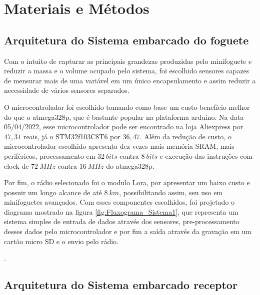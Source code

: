 \chapter{Materiais e Métodos} \label{ch:MM} %


\section{Arquitetura do Sistema embarcado do foguete} 

Com o intuito de capturar as principais grandezas produzidas pelo minifoguete e reduzir a massa e o volume ocupado pelo sistema, foi escolhido sensores capazes de mensurar mais de uma variável em um único encapsulamento e assim reduzir a necessidade de vários sensores separados. 

O microcontrolador foi escolhido tomando como base um custo-benefício melhor do que o atmega328p, que é bastante popular na plataforma arduino. Na data 05/04/2022, esse microcontrolador pode ser encontrado na loja Aliexpress por $47,31$ reais, já o STM32f103C8T6 por $36,47$. Além da redução de custo, o microcontrolador escolhido apresenta dez vezes mais memória SRAM, mais periféricos, processamento em $32 \ bits$ contra $8 \ bits$ e execução das instruções com clock de $72 \ MHz$ contra $16 \ MHz$ do atmega328p. 

Por fim, o rádio selecionado foi o modulo Lora, por apresentar um baixo custo e possuir um longo alcance de até $8 \ km$, possibilitando assim, seu uso em minifoguetes avançados. Com esses componentes escolhidos, foi projetado o diagrama mostrado na figura \ref{fig:Fluxograma_Sistema1}, que representa um sistema simples de entrada de dados através dos sensores, pre-processamento desses dados pelo microcontrolador e por fim a saída através da gravação em um cartão micro SD e o envio pelo rádio.



 .





\section{Arquitetura do Sistema embarcado receptor } 

